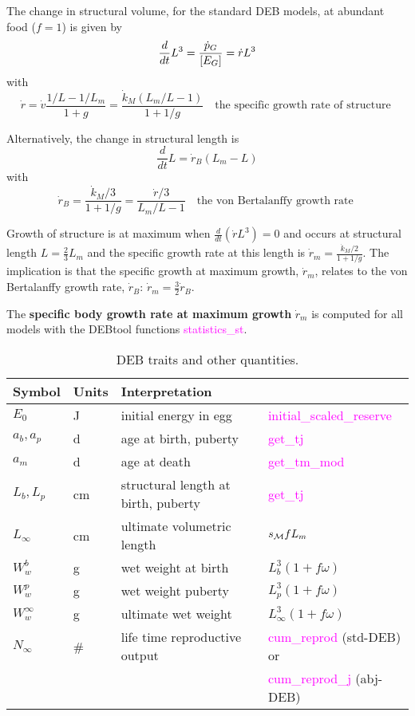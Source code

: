 \documentclass{article}
\begin{document}
The change in structural volume, for the standard DEB models, at abundant food ($f=1$) is given by 
\begin{equation} 
\frac{d}{dt} L^3  = \frac{\dot{p}_G}{[E_G]}=\dot{r} L^3 \\
\end{equation}
with
\begin{equation} 
\dot{r} = \dot{v} \frac{1/ L - 1/ L_m} {1 + g} = \frac{\dot{k}_M (L_m/ L - 1)}{1 + 1/ g} \quad
\mbox{the specific growth rate of structure }
\end{equation}

Alternatively, the change in structural length is 
\begin{equation}
  \frac{d}{dt} L = \dot{r}_B (L_m - L) 
\end{equation}
with
\begin{equation}
 \dot{r}_B = \frac{\dot{k}_M/ 3}{1 + 1/ g} = \frac{\dot{r}/ 3}{L_m/ L - 1} \quad \mbox{the von Bertalanffy growth rate }
\end{equation}

Growth of structure is at maximum when $\frac{d}{dt}(\dot{r}L^3) =0$ and occurs at structural length $L = \frac{2} {3} L_m$ \citep{KooyLika2020} and the specific growth rate at this length is $\dot{r}_m = \frac{\dot{k}_M/ 2}{1 + 1/ g}$. The implication is that the specific growth at maximum growth, $\dot{r}_m$, relates to the von Bertalanffy growth rate, $\dot{r}_B$: $\dot{r}_m = \frac{3}{2} \dot{r}_B$.

The {\bf specific body growth rate at maximum growth} $\dot{r}_m$ is computed for all models with the DEBtool functions \textcolor{magenta}{statistics\_st}. 


\begin{table}[htbp]
    \caption{\protect\small\label{tab:DEB_traits}  DEB traits and other quantities.}
    \centering
    \begin{tabular}{llll} 
    \hline 
    Symbol & Units & Interpretation   \\ [0.75ex]
     \hline \hline
$E_0$ & J& initial energy in egg & \textcolor{magenta}{initial\_scaled\_reserve}\tabularnewline 
$a_b, a_p$ & d & age at birth, puberty& \textcolor{magenta}{get\_tj}\tabularnewline
$a_m$ & d & age at death & \textcolor{magenta}{get\_tm\_mod}\tabularnewline
$L_b, L_p$ & cm &  structural length at birth, puberty & \textcolor{magenta}{get\_tj} \tabularnewline 
$L_\infty$ & cm & ultimate volumetric length & $s_{\cal M}fL_m$\tabularnewline   
$W_w^b$& g &  wet weight at birth& $L_b^3 (1+f \omega)$\tabularnewline   
$W_w^p$ & g &  wet weight puberty & $L_p^3 (1+f \omega)$\tabularnewline   
$W_w^\infty $ & g & ultimate wet weight & $L_\infty^3 (1+f \omega)$ \tabularnewline   
$N_\infty$ & \# & life time reproductive output & \textcolor{magenta}{cum\_reprod} (std-DEB) or\tabularnewline 
 & & & \textcolor{magenta}{cum\_reprod\_j} (abj-DEB) \tabularnewline 
 \hline \hline
    \end{tabular}
\end{table}

\clearpage

\nolinenumbers

\end{document}
